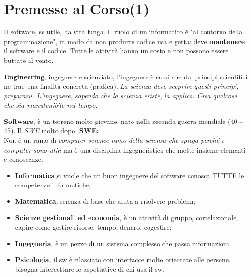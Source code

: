 





\section{Premesse al Corso(1)}

Il software, se utile, ha vita lunga.
Il ruolo di un informatico è "al contorno della programmazione", in modo da non produrre codice usa e getta; deve \textbf{mantenere} il software e il codice. Tutte le attività hanno un costo e non possono essere buttate al vento.

\textbf{Engineering}, ingegnere e scienziato; l'ingegnere è colui che dai principi scientifici ne trae una finalità concreta (pratica).\textit{ La scienza deve scoprire questi principi, prepararli. L'ingegnere, sapendo che la scienza esiste, la applica. Crea qualcosa che sia manutenibile nel tempo.}

\textbf{Software}, è un terreno molto giovane, nato nella seconda guerra mondiale (40 – 45). Il \textit{SWE} molto dopo.
\textbf{SWE:} \\
 Non è un ramo di \textit{computer science} \textit{ramo della scienza che spiega perché i computer sono utili} ma è una disciplina ingegneristica che mette insieme elementi e conoscenze.

\begin{itemize}

	\item \textbf{Informatica},si vuole che un buon ingegnere del software conosca TUTTE le competenze informatiche;
	\item \textbf{Matematica}, scienza di base che aiuta a risolvere problemi;
	\item \textbf{Scienze gestionali ed economia}, è un attività di gruppo, correlazionale, capire come gestire risorse, tempo, denaro, cogestire;
	\item \textbf{Ingegneria}, è un pezzo di un sistema complesso che passa informazioni.
	\item \textbf{Psicologia}, il sw è rilasciato con interfacce molto orientate alle persone, bisogna intercettare le aspettative di chi usa il sw.

\end{itemize}

